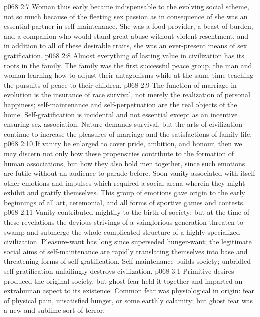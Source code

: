 \vs p068 2:7 Woman thus early became indispensable to the evolving social scheme, not so much because of the fleeting sex passion as in consequence of  she was an essential partner in self\hyp{}maintenance. She was a food provider, a beast of burden, and a companion who would stand great abuse without violent resentment, and in addition to all of these desirable traits, she was an ever\hyp{}present means of sex gratification.
\vs p068 2:8 Almost everything of lasting value in civilization has its roots in the family. The family was the first successful peace group, the man and woman learning how to adjust their antagonisms while at the same time teaching the pursuits of peace to their children.
\vs p068 2:9 The function of marriage in evolution is the insurance of race survival, not merely the realization of personal happiness; self\hyp{}maintenance and self\hyp{}perpetuation are the real objects of the home. Self\hyp{}gratification is incidental and not essential except as an incentive ensuring sex association. Nature demands survival, but the arts of civilization continue to increase the pleasures of marriage and the satisfactions of family life.
\vs p068 2:10 \pc If vanity be enlarged to cover pride, ambition, and honour, then we may discern not only how these propensities contribute to the formation of human associations, but how they also hold men together, since such emotions are futile without an audience to parade before. Soon vanity associated with itself other emotions and impulses which required a social arena wherein they might exhibit and gratify themselves. This group of emotions gave origin to the early beginnings of all art, ceremonial, and all forms of sportive games and contests.
\vs p068 2:11 Vanity contributed mightily to the birth of society; but at the time of these revelations the devious strivings of a vainglorious generation threaten to swamp and submerge the whole complicated structure of a highly specialized civilization. Pleasure\hyp{}want has long since superseded hunger\hyp{}want; the legitimate social aims of self\hyp{}maintenance are rapidly translating themselves into base and threatening forms of self\hyp{}gratification. Self\hyp{}maintenance builds society; unbridled self\hyp{}gratification unfailingly destroys civilization.
\vs p068 3:1 Primitive desires produced the original society, but ghost fear held it together and imparted an extrahuman aspect to its existence. Common fear was physiological in origin: fear of physical pain, unsatisfied hunger, or some earthly calamity; but ghost fear was a new and sublime sort of terror.
